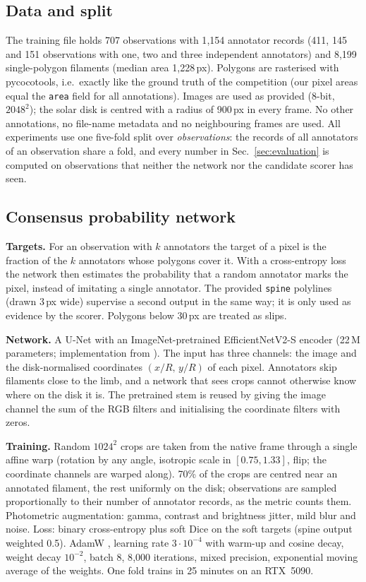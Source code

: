 \documentclass[sigconf]{acmart}
\begin{document}
\subsection{Data and split}
    The training file holds 707 observations with 1{,}154 annotator records (411, 145 and 151 observations with one, two and three independent annotators) and 8{,}199 single-polygon filaments (median area 1{,}228\,px). Polygons are rasterised with pycocotools, i.e.\ exactly like the ground truth of the competition (our pixel areas equal the \texttt{area} field for all annotations). Images are used as provided (8-bit, $2048^2$); the solar disk is centred with a radius of 900\,px in every frame. No other annotations, no file-name metadata and no neighbouring frames are used.
    All experiments use one five-fold split over \emph{observations}: the records of all annotators of an observation share a fold, and every number in Sec.~\ref{sec:evaluation} is computed on observations that neither the network nor the candidate scorer has seen.

\subsection{Consensus probability network}
    \textbf{Targets.} For an observation with $k$ annotators the target of a pixel is the fraction of the $k$ annotators whose polygons cover it. With a cross-entropy loss the network then estimates the probability that a random annotator marks the pixel, instead of imitating a single annotator. The provided \texttt{spine} polylines (drawn 3\,px wide) supervise a second output in the same way; it is only used as evidence by the scorer. Polygons below 30\,px are treated as slips.

    \textbf{Network.} A U-Net \cite{ronneberger2015unet} with an ImageNet-pretrained EfficientNetV2-S encoder \cite{tan2021efficientnetv2} (22\,M parameters; implementation from \cite{iakubovskii2019smp,wightman2019timm}). The input has three channels: the image and the disk-normalised coordinates $(x/R,\,y/R)$ of each pixel. Annotators skip filaments close to the limb, and a network that sees crops cannot otherwise know where on the disk it is. The pretrained stem is reused by giving the image channel the sum of the RGB filters and initialising the coordinate filters with zeros.

    \textbf{Training.} Random $1024^2$ crops are taken from the native frame through a single affine warp (rotation by any angle, isotropic scale in $[0.75,1.33]$, flip; the coordinate channels are warped along). 70\% of the crops are centred near an annotated filament, the rest uniformly on the disk; observations are sampled proportionally to their number of annotator records, as the metric counts them. Photometric augmentation: gamma, contrast and brightness jitter, mild blur and noise. Loss: binary cross-entropy plus soft Dice on the soft targets (spine output weighted 0.5). AdamW \cite{loshchilov2019adamw}, learning rate $3\!\cdot\!10^{-4}$ with warm-up and cosine decay, weight decay $10^{-2}$, batch 8, 8{,}000 iterations, mixed precision, exponential moving average of the weights. One fold trains in 25 minutes on an RTX~5090.
\end{document}
